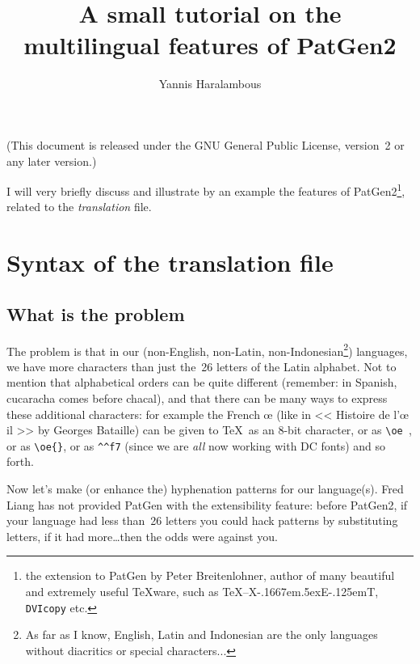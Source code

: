 \title{A small tutorial on the multilingual features of PatGen2}
\author{Yannis Haralambous}
\date{}

\maketitle

\def\XeT{X\kern-.1667em\lower.5ex\hbox{E}\kern-.125emT}

(This document is released under the GNU General Public License,
version~2 or any later version.)

I will very briefly discuss and illustrate by an example the features
of PatGen2\footnote{the extension to PatGen by Peter Breitenlohner,
author of many beautiful and extremely useful \TeX ware, such as
\TeX--\XeT, {\tt DVIcopy} etc.}, related to the {\em translation}
file.

\section{Syntax of the translation file}
\subsection{What is the problem}
The problem is that in our (non-English, non-Latin,
non-Indonesian\footnote{As far as I know, English, Latin and
Indonesian are the only languages without diacritics or special
characters...}) languages, we have more characters than just the~26
letters of the Latin alphabet. Not to mention that alphabetical orders
can be quite different (remember: in Spanish, cucaracha comes before
chacal), and that there can be many ways to express these additional
characters: for example the French \oe{} (like in << Histoire de l'\oe
il >> by Georges Bataille) can be given to \TeX\ as an 8-bit
character, or as \verb*=\oe =, or as \verb=\oe{}=, or as \verb=^^f7=
(since we are {\em all} now working with DC fonts) and so forth.

Now let's make (or enhance the) hyphenation patterns for our language(s).
Fred Liang has not provided PatGen with the extensibility feature: before
PatGen2, if your language had less than~26 letters you could hack patterns by
substituting letters, if it had more\ldots then the odds were against you.

